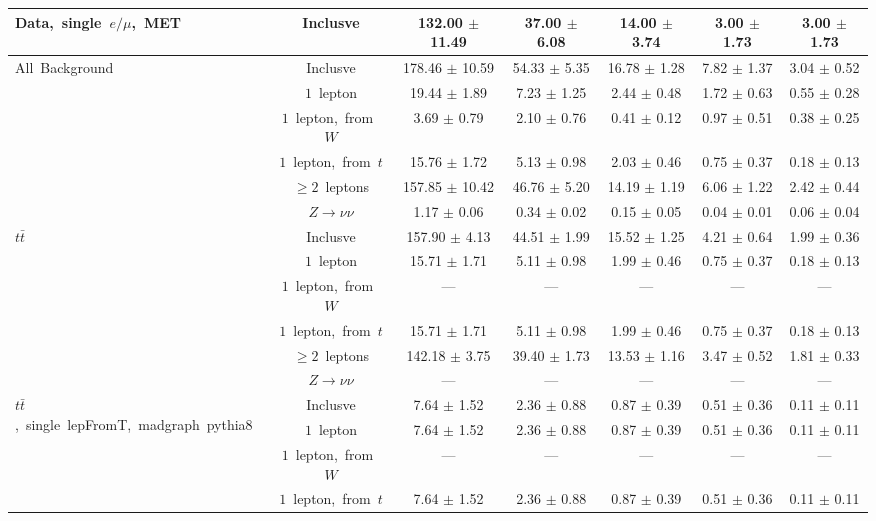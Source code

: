 \documentclass{article}
\begin{document}
\begin{longtable}{|l|c|c|c|c|c|c|}
\multirow{1}{*}{Data,~single~$e/\mu$,~MET} & Inclusve  & 132.00 $\pm$ 11.49  & 37.00 $\pm$ 6.08  & 14.00 $\pm$ 3.74  & 3.00 $\pm$ 1.73  & 3.00 $\pm$ 1.73 \\* 
\hline \hline 
\multirow{6}{*}{All~Background} & Inclusve  & 178.46 $\pm$ 10.59  & 54.33 $\pm$ 5.35  & 16.78 $\pm$ 1.28  & 7.82 $\pm$ 1.37  & 3.04 $\pm$ 0.52 \\* 
 & $1$~lepton  & 19.44 $\pm$ 1.89  & 7.23 $\pm$ 1.25  & 2.44 $\pm$ 0.48  & 1.72 $\pm$ 0.63  & 0.55 $\pm$ 0.28 \\* 
 & $1$~lepton,~from~$W$  & 3.69 $\pm$ 0.79  & 2.10 $\pm$ 0.76  & 0.41 $\pm$ 0.12  & 0.97 $\pm$ 0.51  & 0.38 $\pm$ 0.25 \\* 
 & $1$~lepton,~from~$t$  & 15.76 $\pm$ 1.72  & 5.13 $\pm$ 0.98  & 2.03 $\pm$ 0.46  & 0.75 $\pm$ 0.37  & 0.18 $\pm$ 0.13 \\* 
 & $\ge2$~leptons  & 157.85 $\pm$ 10.42  & 46.76 $\pm$ 5.20  & 14.19 $\pm$ 1.19  & 6.06 $\pm$ 1.22  & 2.42 $\pm$ 0.44 \\* 
 & $Z\rightarrow\nu\nu$  & 1.17 $\pm$ 0.06  & 0.34 $\pm$ 0.02  & 0.15 $\pm$ 0.05  & 0.04 $\pm$ 0.01  & 0.06 $\pm$ 0.04 \\* 
\hline 
\multirow{6}{*}{$t\bar{t}$} & Inclusve  & 157.90 $\pm$ 4.13  & 44.51 $\pm$ 1.99  & 15.52 $\pm$ 1.25  & 4.21 $\pm$ 0.64  & 1.99 $\pm$ 0.36 \\* 
 & $1$~lepton  & 15.71 $\pm$ 1.71  & 5.11 $\pm$ 0.98  & 1.99 $\pm$ 0.46  & 0.75 $\pm$ 0.37  & 0.18 $\pm$ 0.13 \\* 
 & $1$~lepton,~from~$W$  & ---  & ---  & ---  & ---  & --- \\* 
 & $1$~lepton,~from~$t$  & 15.71 $\pm$ 1.71  & 5.11 $\pm$ 0.98  & 1.99 $\pm$ 0.46  & 0.75 $\pm$ 0.37  & 0.18 $\pm$ 0.13 \\* 
 & $\ge2$~leptons  & 142.18 $\pm$ 3.75  & 39.40 $\pm$ 1.73  & 13.53 $\pm$ 1.16  & 3.47 $\pm$ 0.52  & 1.81 $\pm$ 0.33 \\* 
 & $Z\rightarrow\nu\nu$  & ---  & ---  & ---  & ---  & --- \\* 
\hline 
\multirow{6}{*}{$t\bar{t}$,~single~lepFromT,~madgraph~pythia8} & Inclusve  & 7.64 $\pm$ 1.52  & 2.36 $\pm$ 0.88  & 0.87 $\pm$ 0.39  & 0.51 $\pm$ 0.36  & 0.11 $\pm$ 0.11 \\* 
 & $1$~lepton  & 7.64 $\pm$ 1.52  & 2.36 $\pm$ 0.88  & 0.87 $\pm$ 0.39  & 0.51 $\pm$ 0.36  & 0.11 $\pm$ 0.11 \\* 
 & $1$~lepton,~from~$W$  & ---  & ---  & ---  & ---  & --- \\* 
 & $1$~lepton,~from~$t$  & 7.64 $\pm$ 1.52  & 2.36 $\pm$ 0.88  & 0.87 $\pm$ 0.39  & 0.51 $\pm$ 0.36  & 0.11 $\pm$ 0.11 \\* 

\end{longtable}
\end{document}
